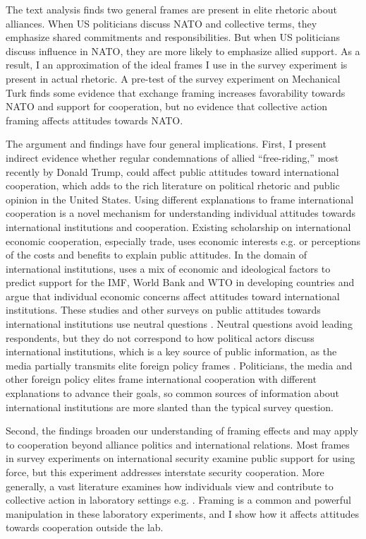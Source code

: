 \documentclass[12pt]{article}
\begin{document}
The text analysis finds two general frames are present in elite rhetoric about alliances. 
When US politicians discuss NATO and collective terms, they emphasize shared commitments and responsibilities. 
But when US politicians discuss influence in NATO, they are more likely to emphasize allied support. 
As a result, I an approximation of the ideal frames I use in the survey experiment is present in actual rhetoric. 
A pre-test of the survey experiment on Mechanical Turk finds some evidence that exchange framing increases favorability towards NATO and support for cooperation, but no evidence that collective action framing affects attitudes towards NATO. 


The argument and findings have four general implications.
First, I present indirect evidence whether regular condemnations of allied ``free-riding,'' most recently by Donald Trump, could affect public attitudes toward international cooperation, which adds to the rich literature on political rhetoric and public opinion in the United States.  
Using different explanations to frame international cooperation is a novel mechanism for understanding individual attitudes towards international institutions and cooperation. 
Existing scholarship on international economic cooperation, especially trade, uses economic interests e.g. \citep{Rogowski1987, MaydaRodrik2005} or perceptions of the costs and benefits \citep{Hainmueller2006, MansfieldMutz2009, RhoTomz2017} to explain public attitudes. 
In the domain of international institutions, \citet{Edwards2009} uses a mix of economic and ideological factors to predict support for the IMF, World Bank and WTO in developing countries and \citet{BearceScott2019} argue that individual economic concerns affect attitudes toward international institutions. 
These studies and other surveys on public attitudes towards international institutions use neutral questions \citep{KayaWalker2014, DellmuthTallberg2015}.
Neutral questions avoid leading respondents, but they do not correspond to how political actors discuss international institutions, which is a key source of public information, as the media partially transmits elite foreign policy frames \citep{BaumPotter2008}. 
Politicians, the media and other foreign policy elites frame international cooperation with different explanations to advance their goals, so common sources of information about international institutions are more slanted than the typical survey question.  


Second, the findings broaden our understanding of framing effects and may apply to cooperation beyond alliance politics and international relations.  
Most frames in survey experiments on international security examine public support for using force, but this experiment addresses interstate security cooperation. 
More generally, a vast literature examines how individuals view and contribute to collective action in laboratory settings e.g. \citep{Ostrometal1992, GachterFehr1999, Houseretal2008, Aimoneetal2013}. 
Framing is a common and powerful manipulation in these laboratory experiments, and I show how it affects attitudes towards cooperation outside the lab. 
\end{document}
